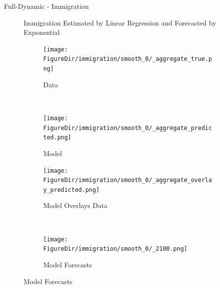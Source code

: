 \documentclass[12pt]{beamer}
\newcommand*{\FigureDir}{../graphs}
\begin{document}
\begin{frame}{Full-Dynamic - Immigration}

	\begin{figure}[H]
		\small{Immigration Estimated by Linear Regression and Forecasted by Exponential}
		\begin{subfigure}{0.5\textwidth}
			\centering
			\texttt{[image: \\FigureDir/immigration/smooth\_0/\_aggregate\_true.png]}
			\vspace{-5mm}
			\caption{Data}
		\end{subfigure}%
		~ %
		\begin{subfigure}{0.5\textwidth}
			\centering
			\texttt{[image: \\FigureDir/immigration/smooth\_0/\_aggregate\_predicted.png]}
			\vspace{-5mm}
			\caption{Model}
		\end{subfigure}%
		\newline
		\begin{subfigure}{0.5\textwidth}
			\centering
			\texttt{[image: \\FigureDir/immigration/smooth\_0/\_aggregate\_overlay\_predicted.png]}
			\vspace{-5mm}
			\caption{Model Overlays Data}
		\end{subfigure}%
		~ %
		\begin{subfigure}{0.5\textwidth}
			\centering
			\texttt{[image: \\FigureDir/immigration/smooth\_0/\_2100.png]}
			\vspace{-5mm}
			\caption{Model Forecasts}
		\end{subfigure}%
	\end{figure}

\end{frame}
\end{document}
